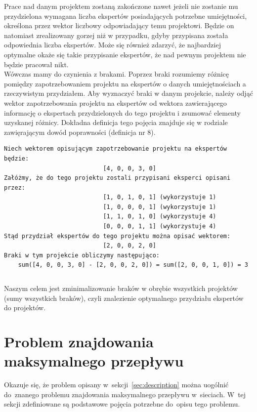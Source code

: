 \documentclass[12pt,a4paper]{article}
\theoremstyle{definition}
\begin{document}
\noindent
Prace nad danym projektem zostaną zakończone nawet jeżeli nie zostanie mu przydzielona wymagana liczba ekspertów posiadających potrzebne umiejętności, określona przez wektor liczbowy odpowiadający temu projektowi. Będzie on natomiast zrealizowany gorzej niż w przypadku, gdyby przypisana została odpowiednia liczba ekspertów. Może się również zdarzyć, że najbardziej optymalne okaże się takie przypisanie ekspertów, że nad pewnym projektem nie będzie pracował nikt.\\

\noindent
Wówczas mamy do czynienia z brakami. Poprzez braki rozumiemy różnicę pomiędzy zapotrzebowaniem projektu na ekspertów o danych umiejętnościach a rzeczywistym przydziałem. Aby wyznaczyć braki w danym projekcie, należy odjąć wektor zapotrzebowania projektu na ekspertów od wektora zawierającego informację o ekspertach przydzielonych do tego projektu i zsumować elementy uzyskanej różnicy. Dokładna definicja tego pojęcia znajduje się w rodziale zawięrającym dowód poprawności (definicja nr 8).

\begin{verbatim}
Niech wektorem opisującym zapotrzebowanie projektu na ekspertów będzie:
                            [4, 0, 0, 3, 0]
Załóżmy, że do tego projektu zostali przypisani eksperci opisani przez:
                            [1, 0, 1, 0, 1] (wykorzystuje 1)
                            [1, 0, 0, 0, 1] (wykorzystuje 1)
                            [1, 1, 0, 1, 0] (wykorzystuje 4)
                            [0, 0, 0, 1, 1] (wykorzystuje 4)
Stąd przydział ekspertów do tego projektu można opisać wektorem:
                            [2, 0, 0, 2, 0]
Braki w tym projekcie obliczymy następująco:
    sum([4, 0, 0, 3, 0] - [2, 0, 0, 2, 0]) = sum([2, 0, 0, 1, 0]) = 3
\end{verbatim}
\begin{lstlisting}[caption={Wektor opisujący zapotrzebowanie projektu}]
\end{lstlisting}

\noindent
Naszym celem jest zminimalizowanie braków w obrębie wszystkich projektów (sumy wszystkich braków), czyli znalezienie optymalnego przydziału ekspertów do projektów.

\section{Problem znajdowania maksymalnego przepływu}
\label{sec:maxflow}
Okazuje się, że problem opisany w~sekcji~\ref{sec:description} można uogólnić
do~znanego problemu znajdowania maksymalnego przepływu w~sieciach. W~tej sekcji
zdefiniowane są podstawowe pojęcia potrzebne do~opisu tego problemu.
\end{document}
